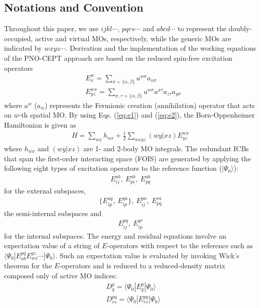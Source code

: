 \documentclass[aip,jcp,amsmath]{revtex4-1}
\begin{document}
\subsection{Notations and Convention}
%
Throughout this paper, we use $ijkl\cdots$, $pqrs\cdots$ and $abcd\cdots$ to represent the doubly-occupied, active and virtual MOs, respectively, while the generic MOs are indicated by $wxyz\cdots$.
%
Derivation and the implementation of the working equations of the PNO-CEPT approach are based on the reduced spin-free excitation operators
%
\begin{align}
  &E^w_x = \sum_{\sigma=\{\alpha,\beta\}} a^{w\sigma}a_{x\sigma} \label{eq:e1} \\
  &E^{wx}_{yz} = \sum_{\sigma,\tau=\{\alpha,\beta\}} a^{w\sigma}a^{x\tau}a_{z\tau}a_{y\sigma} \label{eq:e2}
\end{align}
%
where $a^{w}$ ($a_w$) represents the Fermionic creation (annihilation) operator that acts on $w$-th spatial MO.
%
By using Eqs. (\ref{eq:e1}) and (\ref{eq:e2}), the Born-Oppenheimer Hamiltonian is given as
\begin{align}
  H=\sum_{wx} h_{wx} + \frac{1}{2}\sum_{wxyz} (wy|xz) E^{wx}_{yz}
\end{align}
%
where $h_{wx}$ and $(wy|xz)$ are 1- and 2-body MO integrals.
%
The redundant ICBs that span the first-order interacting space (FOIS) are generated by applying the following eight types of excitation operators to the reference function ($|\Psi_0\rangle$):
%
\begin{align}
  E_{ij}^{ab},\ E_{pi}^{ab},\ E_{pq}^{ab} \label{eq:externalICB}
\end{align}
%
for the external subspaces,
%
\begin{align}
  \{E_{ip}^{aq},\ E_{ip}^{qa}\},\ E_{ij}^{pa},\ E_{pq}^{ra}
\end{align}
%
the semi-internal subspaces and
%
\begin{align}
  E_{ij}^{pq},\ E_{ip}^{qr}
\end{align}
%
for the internal subspaces.
%
The energy and residual equations involve an expectation value of a string of $E$-operators with respect to the reference such as $\langle\Psi_0|E^{pq}_{ab}E_{wx}^{yz}\cdots|\Psi_0\rangle$.
%
Such an expectation value is evaluated by invoking Wick's theorem for the $E$-operators and is reduced to a reduced-density matrix composed only of active MO indices:
%
\begin{align}
  &D^{p}_{q} = \langle\Psi_0|E^{p}_{q}|\Psi_0\rangle  \\
  &D^{pq}_{rs} = \langle\Psi_0|E^{pq}_{rs}|\Psi_0\rangle
\end{align}
\end{document}
